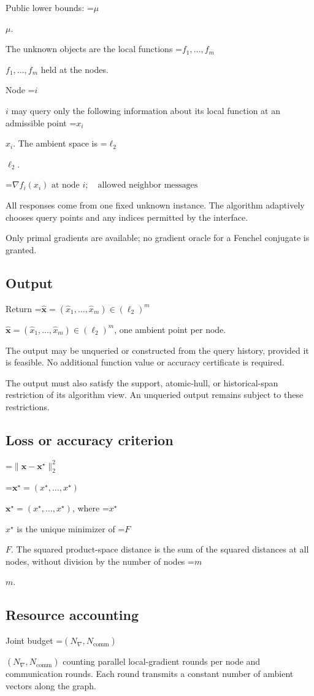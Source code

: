 \documentclass[10pt,a4paper]{article}
\newcommand{\AtlasMath}[1]{\par\begingroup\centering\setbox0=\hbox{$\displaystyle #1$}\ifdim\wd0>1.4\linewidth\typeout{ATLAS WIDE FORMULA: \the\wd0}\fi\ifdim\wd0>\linewidth\resizebox{\linewidth}{!}{\box0}\else\box0\fi\par\endgroup}
\newcommand{\AtlasInlineMath}[1]{\begingroup\setbox0=\hbox{$#1$}\ifdim\wd0>.4\linewidth\endgroup\AtlasMath{#1}\else\endgroup$#1$\fi}
\begin{document}
Public lower bounds: \AtlasInlineMath{\mu}.

The unknown objects are the local functions \AtlasInlineMath{f_1,\ldots,f_m} held at the nodes.

Node \AtlasInlineMath{i} may query only the following information about its local function at an admissible point \AtlasInlineMath{x_i}. The ambient space is \AtlasInlineMath{\ell_2}.


\AtlasMath{\nabla f_i(x_i)\text{ at node }i;\quad\text{allowed neighbor messages}}


All responses come from one fixed unknown instance. The algorithm adaptively chooses query points and any indices permitted by the interface.

Only primal gradients are available; no gradient oracle for a Fenchel conjugate is granted.

\subsection{Output}
Return \AtlasInlineMath{\widehat{\boldsymbol x}=(\widehat x_1,\ldots,\widehat x_m)\in(\ell_2)^m}, one ambient point per node.

The output may be unqueried or constructed from the query history, provided it is feasible. No additional function value or accuracy certificate is required.

The output must also satisfy the support, atomic-hull, or historical-span restriction of its algorithm view. An unqueried output remains subject to these restrictions.

\subsection{Loss or accuracy criterion}

\AtlasMath{\|\boldsymbol x-\boldsymbol x^\star\|_2^2}


\AtlasInlineMath{\boldsymbol{x}^\star=(x^\star,\ldots,x^\star)}, where \AtlasInlineMath{x^\star} is the unique minimizer of \AtlasInlineMath{F}. The squared product-space distance is the sum of the squared distances at all nodes, without division by the number of nodes \AtlasInlineMath{m}.

\subsection{Resource accounting}
Joint budget \AtlasInlineMath{(N_\nabla,N_{\mathrm{comm}})} counting parallel local-gradient rounds per node and communication rounds. Each round transmits a constant number of ambient vectors along the graph.
\end{document}
